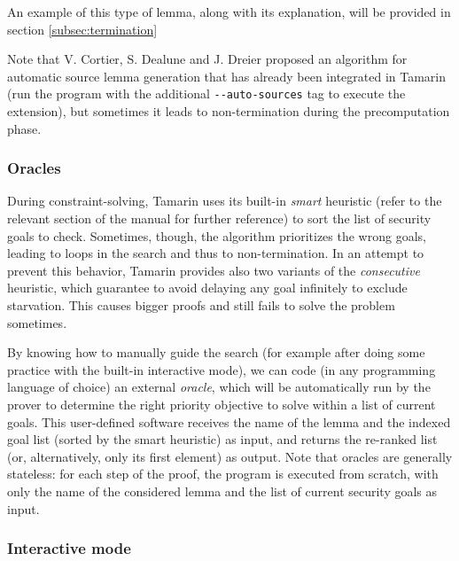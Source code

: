 \documentclass[fleqn,10pt]{SelfArx} %
\begin{document}
An example of this type of lemma, along with its explanation, will be provided in section \ref{subsec:termination}

Note that V. Cortier, S. Dealune and J. Dreier proposed an algorithm for automatic source lemma generation \cite{autosources} that has already been integrated in Tamarin (run the program with the additional \lstinline|--auto-sources| tag to execute the extension), but sometimes it leads to non-termination during the precomputation phase.

\subsubsection{Oracles}

During constraint-solving, Tamarin uses its built-in \textit{smart} heuristic (refer to the relevant section of the manual \cite{tamarinManual} for further reference) to sort the list of security goals to check. Sometimes, though, the algorithm prioritizes the wrong goals, leading to loops in the search and thus to non-termination. In an attempt to prevent this behavior, Tamarin provides also two variants of the \textit{consecutive} heuristic, which guarantee to avoid delaying any goal infinitely to exclude starvation. This causes bigger proofs and still fails to solve the problem sometimes.

By knowing how to manually guide the search (for example after doing some practice with the built-in interactive mode), we can code (in any programming language of choice) an external \textit{oracle}, which will be automatically run by the prover to determine the right priority objective to solve within a list of current goals. This user-defined software receives the name of the lemma and the indexed goal list (sorted by the smart heuristic) as input, and returns the re-ranked list (or, alternatively, only its first element) as output. Note that oracles are generally stateless: for each step of the proof, the program is executed from scratch, with only the name of the considered lemma and the list of current security goals as input.

\subsubsection{Interactive mode}\label{subsec:tamarinGui}
\end{document}
